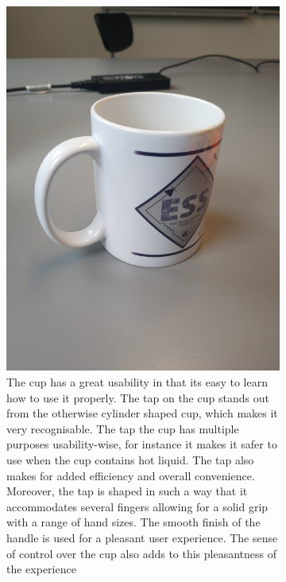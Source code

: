 \documentclass[11pt]{article}
\begin{document}
\begin{figure}[!h]
    \begin{subfigure}[t]{0.5\textwidth}
        \includegraphics[scale=0.4]{InteraktionsDesign/Assets/kop.jpg}
        \caption{The cup has a great usability in that its easy to learn how to use it properly. The tap on the cup stands out from the otherwise cylinder shaped cup, which makes it very recognisable. The tap the cup has multiple purposes usability-wise, for instance it makes it safer to use when the cup contains hot liquid. The tap also makes for added efficiency and overall convenience.
        Moreover, the tap is shaped in such a way that it accommodates several fingers allowing for a solid grip with a range of hand sizes. The smooth finish of the handle is used for a pleasant user experience. The sense of control over the cup also adds to this pleasantness of the experience}
        \label{fig:cup}
    \end{subfigure}
    \begin{subfigure}[t]{0.5\textwidth}

\end{subfigure}
\end{figure}
\end{document}

